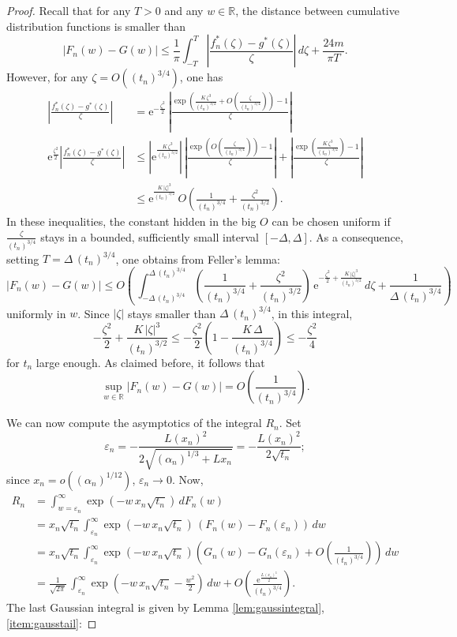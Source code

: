 \documentclass[12pt,a4paper,reqno]{amsart}
\theoremstyle{remark}
\newcommand{\R}{\mathbb{R}}
\newcommand{\E}{\mathrm{e}}
\newcommand{\eps}{\varepsilon}
\newcommand{\alphan}{\alpha_n}
\begin{document}
\begin{proof}
Recall that for any $T>0$ and any $w \in \R$, the distance between cumulative distribution functions is smaller than
$$|F_n(w)-G(w)|\leq \frac{1}{\pi} \int_{-T}^{T} \left|\frac{f_n^{*}(\zeta)-g^{*}(\zeta)}{\zeta}\right|\, d\zeta +\frac{24m}{\pi T}.$$
However, for any $\zeta=O((t_n)^{3/4})$, one has
\begin{align*}
\left|\frac{f_n^{*}(\zeta)-g^{*}(\zeta)}{\zeta}\right| &= \E^{-\frac{\zeta^2}{2}} \,\left|\frac{\exp\left(\frac{K\,\zeta^3}{(t_n)^{3/2}} + O\!\left(\frac{\zeta}{(t_n)^{3/4}}\right)\right)-1}{\zeta}\right| \\
\E^{\frac{\zeta^2}{2}}\left|\frac{f_n^{*}(\zeta)-g^{*}(\zeta)}{\zeta}\right| &\leq \left|\E^{\frac{K\,\zeta^3}{(t_n)^{3/2}}}\right|\,\left|\frac{\exp\left(O\!\left(\frac{\zeta}{(t_n)^{3/4}}\right)\right)-1}{\zeta}\right| + \left|\frac{\exp\left(\frac{K\,\zeta^3}{(t_n)^{3/2}}\right)-1}{\zeta}\right|  \\
&\leq \E^{\frac{K\,|\zeta|^3}{(t_n)^{3/2}}} \,O\!\left(\frac{1}{(t_n)^{3/4}} + \frac{\zeta^2}{(t_n)^{3/2}}\right).
\end{align*}
In these inequalities, the constant hidden in the big $O$ can be chosen uniform if $\frac{\zeta}{(t_{n})^{3/4}}$ stays in a bounded, sufficiently small interval $[-\Delta,\Delta]$. As a consequence, setting $T=\Delta\,(t_n)^{3/4}$, one obtains from Feller's lemma:
$$|F_n(w)-G(w)|\leq O\left(\,\int_{-\Delta\,(t_n)^{3/4}}^{\Delta\,(t_n)^{3/4}} \left(\frac{1}{(t_n)^{3/4}} + \frac{\zeta^2}{(t_n)^{3/2}}\right)\, \E^{-\frac{\zeta^2}{2} + \frac{K\,|\zeta|^3}{(t_n)^{3/2}}}\,d\zeta +\frac{1}{\Delta\,(t_n)^{3/4}}\right)$$
uniformly in $w$.
Since $|\zeta|$ stays smaller than $\Delta\,(t_n)^{3/4}$, in this integral,
$$-\frac{\zeta^2}{2} + \frac{K\,|\zeta|^3}{(t_n)^{3/2}} \leq -\frac{\zeta^2}{2}\left(1-\frac{K\,\Delta}{(t_n)^{3/4}}\right) \leq -\frac{\zeta^2}{4}$$
for $t_n$ large enough. As claimed before, it follows that
$$\sup_{w \in \R} |F_n(w)-G(w)| = O\left(\frac{1}{(t_n)^{3/4}}\right).$$
\bigskip

We can now compute the asymptotics of the integral $R_n$. Set
$$\eps_n = -\frac{L(x_n)^2}{2\sqrt{(\alphan)^{1/3}+Lx_n}} = -\frac{L(x_n)^2}{2\sqrt{t_n}};$$
since $x_n = o((\alphan)^{1/12})$, $\eps_n \to 0$. Now,
\begin{align*}
R_n&=\int_{w=\eps_n}^\infty \exp\left(-w\,x_n\sqrt{t_n} \right)\,dF_n(w)\\
&=x_n\sqrt{t_n} \int_{\eps_n}^{\infty}\exp\left(-w\,x_n\sqrt{t_n} \right)\,(F_n(w)-F_n(\eps_n))\,dw \\
&=x_n\sqrt{t_n} \int_{\eps_n}^{\infty}\exp\left(-w\,x_n\sqrt{t_n} \right)\left(G_n(w)-G_n(\eps_n) + O\!\left(\frac{1}{(t_n)^{3/4}}\right)\right)\,dw \\
&=\frac{1}{\sqrt{2\pi}}\,\int_{\eps_n}^{\infty} \exp\left(-w\,x_n\sqrt{t_n}-\frac{w^2}{2} \right)\,dw + O\!\left(\frac{\E^{\frac{L\,(x_n)^3}{2}}}{(t_n)^{3/4}}\right).
\end{align*}
The last Gaussian integral is given by Lemma \ref{lem:gaussintegral}, \eqref{item:gausstail}:


\end{proof}
\end{document}
